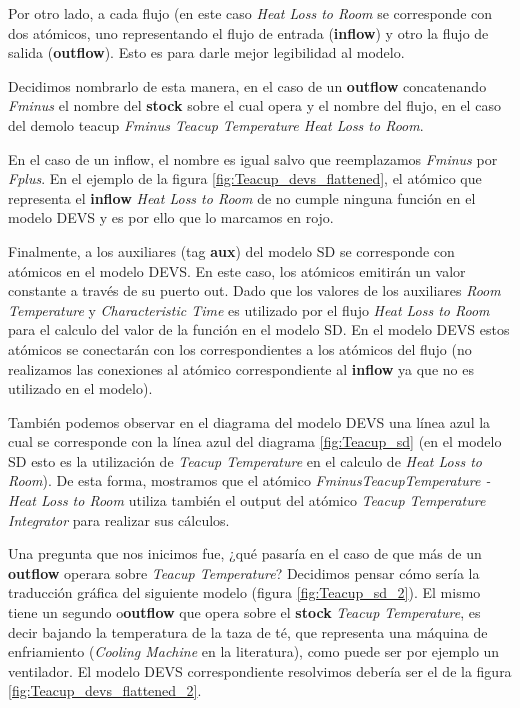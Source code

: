 Por otro lado, a cada flujo (en este caso \textit{Heat Loss to Room} se corresponde con dos atómicos, uno representando el flujo de entrada (\textbf{inflow}) y otro la flujo de salida (\textbf{outflow}). Esto es para darle mejor legibilidad al modelo.

Decidimos nombrarlo de esta manera, en el caso de un \textbf{outflow} concatenando \textit{Fminus} el nombre del \textbf{stock} sobre el cual opera y el nombre del flujo, en el caso del demolo teacup \textit{Fminus Teacup Temperature Heat Loss to Room}.

En el caso de un inflow, el nombre es igual salvo que reemplazamos \textit{Fminus} por \textit{Fplus}. En el ejemplo de la figura \ref{fig:Teacup_devs_flattened}, el atómico que representa el \textbf{inflow} \textit{Heat Loss to Room} de no cumple ninguna función en el modelo DEVS y es por ello que lo marcamos en rojo. 

Finalmente, a los auxiliares (tag \textbf{aux}) del modelo SD se corresponde con atómicos en el modelo DEVS. En este caso, los atómicos emitirán un valor constante a través de su puerto out. Dado que los valores de los auxiliares \textit{Room Temperature} y \textit{Characteristic Time} es utilizado por el flujo \textit{Heat Loss to Room} para el calculo del valor de la función en el modelo SD. En el modelo DEVS estos atómicos se conectarán con los correspondientes a los atómicos del flujo (no realizamos las conexiones al atómico correspondiente al \textbf{inflow} ya que no es utilizado en el modelo).

También podemos observar en el diagrama del modelo DEVS una línea azul la cual se corresponde con la línea azul del diagrama \ref{fig:Teacup_sd} (en el modelo SD esto es la utilización de \textit{Teacup Temperature} en el calculo de \textit{Heat Loss to Room}). De esta forma, mostramos que el atómico \textit{FminusTeacupTemperature - Heat Loss to Room} utiliza también el output del atómico \textit{Teacup Temperature Integrator} para realizar sus cálculos. 

Una pregunta que nos inicimos fue, ¿qué pasaría en el caso de que más de un \textbf{outflow} operara sobre \textit{Teacup Temperature}?
Decidimos pensar cómo sería la traducción gráfica del siguiente modelo (figura \ref{fig:Teacup_sd_2}). El mismo tiene un segundo o\textbf{outflow} que opera sobre el \textbf{stock} \textit{Teacup Temperature}, es decir bajando la temperatura de la taza de té, que representa una máquina de enfriamiento (\textit{Cooling Machine} en la literatura), como puede ser por ejemplo un ventilador. El modelo DEVS correspondiente resolvimos debería ser el de la figura \ref{fig:Teacup_devs_flattened_2}. 

